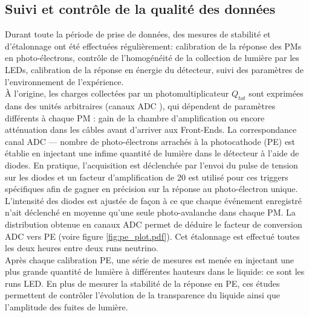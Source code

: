 
\subsection{Suivi et contrôle de la qualité des données} 
\label{sec:data_quality_control} 

Durant toute la période de prise de données, des mesures de stabilité et d'étalonnage ont été effectuées régulièrement: calibration de la réponse des PMs en photo-électrons, contrôle de l'homogénéité de la collection de lumière par les LEDs, calibration de la réponse en énergie du détecteur, suivi des paramètres de l'environnement de l'expérience.\\ 

À l'origine, les charges collectées par un photomultiplicateur $Q_{tot}$ sont exprimées dans des unités arbitraires (\og canaux ADC \fg{}), qui dépendent de paramètres différents à chaque PM : gain de la chambre d'amplification ou encore atténuation dans les câbles avant d'arriver aux Front-Ends. La correspondance canal ADC --- nombre de photo-électrons arrachés à la photocathode (PE) est établie en injectant une infime quantité de lumière dans le détecteur à l'aide de diodes. En pratique, l'acquisition est déclenchée par l'envoi du pulse de tension sur les diodes et un facteur d'amplification de 20 est utilisé pour ces triggers spécifiques afin de gagner en précision sur la réponse au photo-électron unique. L'intensité des diodes est ajustée de façon à ce que chaque événement enregistré n'ait déclenché en moyenne qu'une seule photo-avalanche dans chaque PM. La distribution obtenue en canaux ADC permet de déduire le facteur de conversion ADC vers PE (voire figure \ref{fig:pe_plot.pdf}). Cet étalonnage est effectué toutes les deux heures entre deux runs neutrino.\\ 

Après chaque calibration PE, une série de mesures est menée en injectant une plus grande quantité de lumière à différentes hauteurs dans le liquide: ce sont les runs LED. En plus de mesurer la stabilité de la réponse en PE, ces études permettent de contrôler l'évolution de la transparence du liquide ainsi que l'amplitude des fuites de lumière.\\ 

